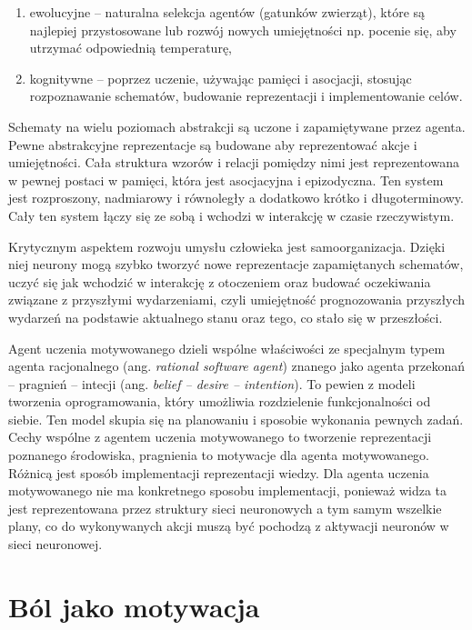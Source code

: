 \begin{enumerate}
	\item ewolucyjne -- naturalna selekcja agentów (gatunków zwierząt), które 
	są najlepiej przystosowane lub rozwój nowych umiejętności np. pocenie się, 
	aby utrzymać odpowiednią temperaturę,
	
	\item kognitywne -- poprzez uczenie, używając pamięci i asocjacji, stosując 
	rozpoznawanie schematów, budowanie reprezentacji i implementowanie celów.
\end{enumerate}

Schematy na wielu poziomach abstrakcji są uczone i zapamiętywane przez agenta. 
Pewne abstrakcyjne reprezentacje są budowane aby reprezentować akcje i 
umiejętności. Cała struktura wzorów i relacji pomiędzy nimi jest reprezentowana 
w pewnej postaci w pamięci, która jest asocjacyjna i epizodyczna. Ten system 
jest rozproszony, nadmiarowy i równoległy a dodatkowo krótko i długoterminowy. 
Cały ten system łączy się ze sobą i wchodzi w interakcję w czasie rzeczywistym.

Krytycznym aspektem rozwoju umysłu człowieka jest samoorganizacja. Dzięki niej 
neurony mogą szybko tworzyć nowe reprezentacje zapamiętanych schematów, uczyć 
się jak wchodzić w interakcję z otoczeniem oraz budować oczekiwania związane z 
przyszłymi wydarzeniami, czyli umiejętność prognozowania przyszłych wydarzeń na 
podstawie aktualnego stanu oraz tego, co stało się w przeszłości.

Agent uczenia motywowanego dzieli wspólne właściwości ze specjalnym typem 
agenta racjonalnego (ang. \textit{rational software agent}) znanego jako agenta 
przekonań -- pragnień -- intecji (ang. \textit{belief -- desire -- intention}). 
To pewien z modeli tworzenia oprogramowania, który umożliwia rozdzielenie 
funkcjonalności od siebie. Ten model skupia się na planowaniu i sposobie 
wykonania pewnych zadań. Cechy wspólne z agentem uczenia motywowanego to 
tworzenie reprezentacji poznanego środowiska, pragnienia to motywacje dla 
agenta motywowanego. Różnicą jest sposób implementacji reprezentacji wiedzy. 
Dla agenta uczenia motywowanego nie ma konkretnego sposobu implementacji, 
ponieważ widza ta jest reprezentowana przez struktury sieci neuronowych a tym 
samym wszelkie plany, co do wykonywanych akcji muszą być pochodzą z aktywacji 
neuronów w sieci neuronowej.

\section{Ból jako motywacja}

